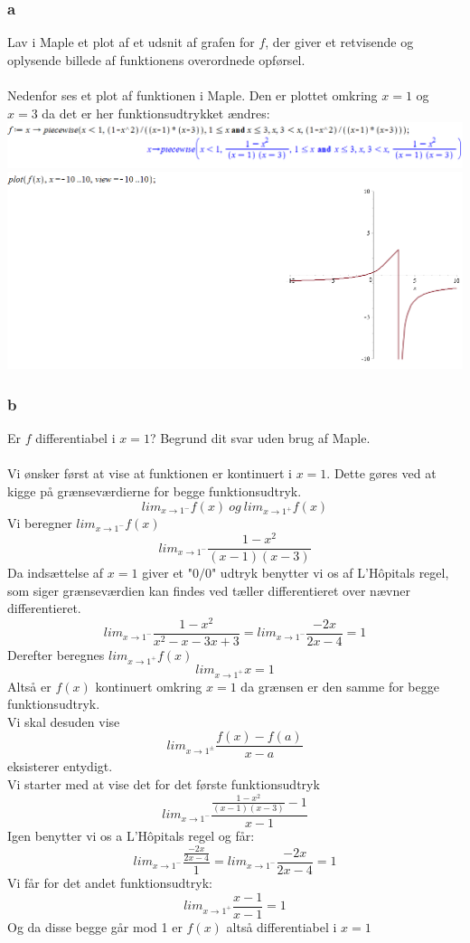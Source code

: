 \documentclass[12pt]{article}
\begin{document}
\subsubsection*{a}
Lav i Maple et plot af et udsnit af grafen for $f$, der giver et retvisende og oplysende billede af funktionens overordnede opførsel.\\
\\
Nedenfor ses et plot af funktionen i Maple. Den er plottet omkring $x=1$ og $x=3$ da det er her funktionsudtrykket ændres:\\
\includegraphics[scale=0.6]{Pic4}\\
\includegraphics[scale=0.6]{Pic5}

\subsubsection*{b}
Er $f$ differentiabel i $x=1$? Begrund dit svar uden brug af Maple.\\
\\
Vi ønsker først at vise at funktionen er kontinuert i $x=1$. Dette gøres ved at kigge på grænseværdierne for begge funktionsudtryk.\\
$$lim_{x\rightarrow 1^{-}}f(x)\:og\:lim_{x\rightarrow 1^{+}}f(x)$$
Vi beregner $lim_{x\rightarrow 1^{-}}f(x)$
$$lim_{x\rightarrow 1^{-}}\frac{1-x^2}{(x-1)(x-3)}$$
Da indsættelse af $x=1$ giver et "$0/0$" udtryk benytter vi os af L'Hôpitals regel, som siger grænseværdien kan findes ved tæller differentieret over nævner differentieret.
$$lim_{x\rightarrow 1^{-}}\frac{1-x^2}{x^2-x-3x+3}=lim_{x\rightarrow 1^{-}}\frac{-2x}{2x-4}=1$$
Derefter beregnes $lim_{x\rightarrow 1^{+}}f(x)$
$$lim_{x\rightarrow 1^{+}}x=1$$
Altså er $f(x)$ kontinuert omkring $x=1$ da grænsen er den samme for begge funktionsudtryk.\\
Vi skal desuden vise
$$lim_{x\rightarrow 1^{\pm}}\frac{f(x)-f(a)}{x-a}$$
eksisterer entydigt.\\
Vi starter med at vise det for det første funktionsudtryk\\
$$lim_{x\rightarrow 1^{-}}\frac{\frac{1-x^2}{(x-1)(x-3)}-1}{x-1}$$
Igen benytter vi os a L'Hôpitals regel og får:
$$lim_{x\rightarrow 1^{-}}\frac{\frac{-2x}{2x-4}}{1}=lim_{x\rightarrow 1^{-}}\frac{-2x}{2x-4}=1$$
Vi får for det andet funktionsudtryk:
$$lim_{x\rightarrow 1^{+}}\frac{x-1}{x-1}=1$$
Og da disse begge går mod 1 er $f(x)$ altså differentiabel i $x=1$
\end{document}
